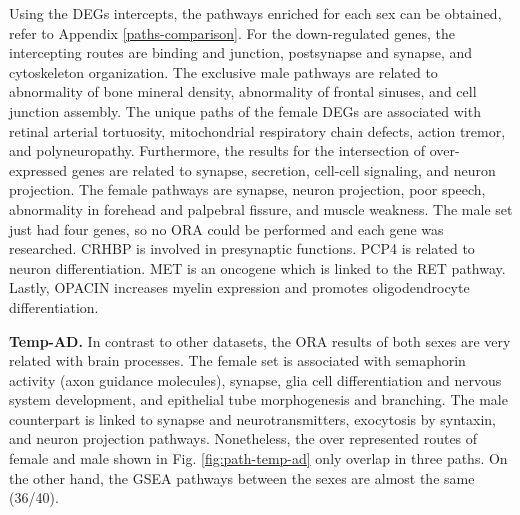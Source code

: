 Using the DEGs intercepts, the pathways enriched for each sex can be obtained, refer to Appendix \ref{paths-comparison}. For the down-regulated genes, the intercepting routes are binding and junction, postsynapse and synapse, and cytoskeleton organization. The exclusive male pathways are related to abnormality of bone mineral density, abnormality of frontal sinuses, and cell junction assembly. The unique paths of the female DEGs are associated with retinal arterial tortuosity, mitochondrial respiratory chain defects, action tremor, and polyneuropathy. Furthermore, the results for the intersection of over-expressed genes are related to synapse, secretion, cell-cell signaling, and neuron projection. The female pathways are synapse, neuron projection, poor speech, abnormality in forehead and palpebral fissure, and muscle weakness. The male set just had four genes, so no ORA could be performed and each gene was researched. CRHBP is involved in presynaptic functions. PCP4 is related to neuron differentiation. MET is an oncogene which is linked to the RET pathway. Lastly, OPACIN increases myelin expression and promotes oligodendrocyte differentiation.

\textbf{Temp-AD.} In contrast to other datasets, the ORA results of both sexes are very related with brain processes. The female set is associated with semaphorin activity (axon guidance molecules), synapse, glia cell differentiation and nervous system development, and epithelial tube morphogenesis and branching. The male counterpart is linked to synapse and neurotransmitters, exocytosis by syntaxin, and neuron projection pathways. Nonetheless, the over represented routes of female and male shown in Fig. \ref{fig:path-temp-ad} only overlap in three paths. On the other hand, the GSEA pathways between the sexes are almost the same (36/40). 

